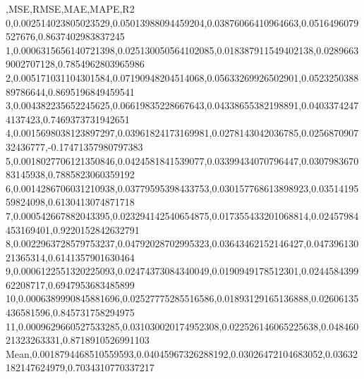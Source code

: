,MSE,RMSE,MAE,MAPE,R2
0,0.002514023805023529,0.05013988094459204,0.03876066410964663,0.0516496079527676,0.8637402983837245
1,0.0006315656140721398,0.025130050564102085,0.018387911549402138,0.02896639002707128,0.7854962803965986
2,0.005171031104301584,0.07190948204514068,0.05633269926502901,0.052325038889786644,0.8695196849459541
3,0.004382235652245625,0.06619835228667643,0.04338655382198891,0.04033742474137423,0.7469373731942651
4,0.0015698038123897297,0.03961824173169981,0.0278143042036785,0.025687090732436777,-0.17471357980797383
5,0.0018027706121350846,0.0424581841539077,0.03399434070796447,0.030798367083145938,0.7885823060359192
6,0.0014286706031210938,0.03779595398433753,0.030157768613898923,0.0351419559824098,0.6130413074871718
7,0.000542667882043395,0.023294142540654875,0.017355433201068814,0.02457984453169401,0.9220152842632791
8,0.0022963728579753237,0.04792028702995323,0.03643462152146427,0.04739613021365314,0.6141357901630464
9,0.0006122551320225093,0.02474373084340049,0.0190949178512301,0.024458439962208717,0.6947953683485899
10,0.0006389990845881696,0.02527775285516586,0.01893129165136888,0.02606135436581596,0.845731758294975
11,0.0009629660527533285,0.031030020174952308,0.022526146065225638,0.04846021323263331,0.8718910526991103
Mean,0.0018794468510559593,0.04045967326288192,0.03026472104683052,0.03632182147624979,0.7034310770337217

